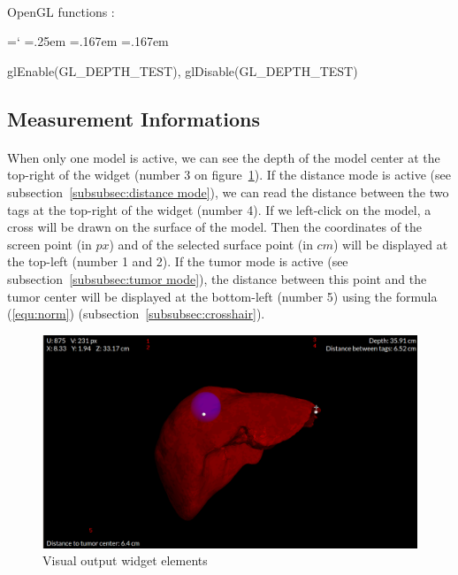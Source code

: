 \documentclass[12pt]{report}
\DeclareRobustCommand*{\ttfamily}{
  \origttfamily
  \hyphenchar\font=`\-\relax
  \fontdimen3\font=.25em\relax
  \fontdimen4\font=.167em\relax
  \fontdimen7\font=.167em\relax
}
\newenvironment{code}{\ttfamily}{}
\begin{document}
\paragraph{}
	OpenGL functions :

	\begin{code}
	glEnable(GL\_DEPTH\_TEST), glDisable(GL\_DEPTH\_TEST)
	\end{code}
 


\subsection{Measurement Informations}
\paragraph{}
	When only one model is active, we can see the depth of the model center at the top-right of the widget (number 3 on figure~\ref{centralwidget}). If the distance mode is active (see subsection~\ref{subsubsec:distance mode}), we can read the distance between the two tags at the top-right of the widget (number 4). If we left-click on the model, a cross will be drawn on the surface of the model. Then the coordinates of the screen point (in $px$) and of the selected surface point (in $cm$) will be displayed at the top-left (number 1 and 2). If the tumor mode is active (see subsection~\ref{subsubsec:tumor mode}), the distance between this point and the tumor center will be displayed at the bottom-left (number 5) using the formula (\ref{equ:norm}) (subsection~\ref{subsubsec:crosshair}).

\begin{figure}[H]
\centerline{\includegraphics[scale = 0.3]{img/centralWidget.png}}
\caption{Visual output widget elements}
\label{centralwidget}
\end{figure}
\end{document}
